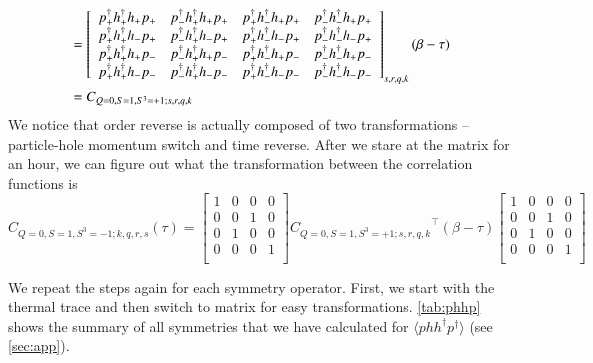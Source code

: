 \begin{equation}
  \begin{aligned}
    &= \left[ 
    \begin{array}{cccc}
      \dcor{+}{+}{+}{+} & \dcor{+}{+}{+}{-} & \dcor{+}{+}{-}{+} & \dcor{+}{+}{-}{-} \\
      \dcor{+}{-}{+}{+} & \dcor{+}{-}{+}{-} & \dcor{+}{-}{-}{+} & \dcor{+}{-}{-}{-} \\
      \dcor{-}{+}{+}{+} & \dcor{-}{+}{+}{-} & \dcor{-}{+}{-}{+} & \dcor{-}{+}{-}{-} \\
      \dcor{-}{-}{+}{+} & \dcor{-}{-}{+}{-} & \dcor{-}{-}{-}{+} & \dcor{-}{-}{-}{-} \\
    \end{array} \right]_{s,r,q,k} (\beta-\tau) \\
    &= C_{Q=0,S=1,S^3=+1;s,r,q,k}
  \end{aligned}
\end{equation}
We notice that order reverse is actually composed of two transformations -- particle-hole momentum switch and time reverse. After we stare at the matrix for an hour, we can figure out what the transformation between the correlation functions is
\begin{equation}
  C_{Q=0,S=1,S^3=-1;k,q,r,s} (\tau) =
  \left[ {\begin{array}{cccc}
    1 & 0 & 0 & 0 \\
    0 & 0 & 1 & 0 \\
    0 & 1 & 0 & 0 \\
    0 & 0 & 0 & 1 \\
  \end{array} } \right]
  {C_{Q=0,S=1,S^3=+1;s,r,q,k}}^\top (\beta-\tau)
  \left[ {\begin{array}{cccc}
    1 & 0 & 0 & 0 \\
    0 & 0 & 1 & 0 \\
    0 & 1 & 0 & 0 \\
    0 & 0 & 0 & 1 \\
  \end{array} } \right]
\end{equation}

We repeat the steps again for each symmetry operator. First, we start with the thermal trace and then switch to matrix for easy transformations.   \cref{tab:phhp} shows the summary of all symmetries that we have calculated for $\langle phh^\dagger p^\dagger \rangle$ (see \cref{sec:app}).


